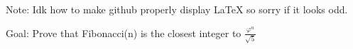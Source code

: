 Note: Idk how to make github properly display LaTeX so sorry if it looks odd.

Goal: Prove that Fibonacci(n) is the closest integer to $\frac{\varphi^n}{\sqrt{5}}$
